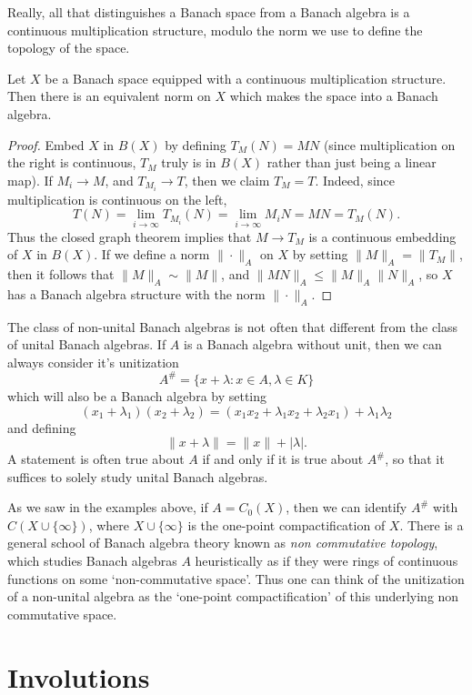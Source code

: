 Really, all that distinguishes a Banach space from a Banach algebra is a continuous multiplication structure, modulo the norm we use to define the topology of the space.

\begin{prop}
    Let $X$ be a Banach space equipped with a continuous multiplication structure. Then there is an equivalent norm on $X$ which makes the space into a Banach algebra.
\end{prop}
\begin{proof}
    Embed $X$ in $B(X)$ by defining $T_M(N) = MN$ (since multiplication on the right is continuous, $T_M$ truly is in $B(X)$ rather than just being a linear map). If $M_i \to M$, and $T_{M_i} \to T$, then we claim $T_M = T$. Indeed, since multiplication is continuous on the left,
    \[ T(N) = \lim_{i \to \infty} T_{M_i}(N) = \lim_{i \to \infty} M_i N = MN = T_M(N). \]
    Thus the closed graph theorem implies that $M \to T_M$ is a continuous embedding of $X$ in $B(X)$. If we define a norm $\| \cdot \|_A$ on $X$ by setting $\| M \|_A = \| T_M \|$, then it follows that $\| M \|_A \sim \| M \|$, and $\| MN \|_A \leq \| M \|_A \| N \|_A$, so $X$ has a Banach algebra structure with the norm $\| \cdot \|_A$.
\end{proof}

The class of non-unital Banach algebras is not often that different from the class of unital Banach algebras. If $A$ is a Banach algebra without unit, then we can always consider it's unitization
%
\[ A^\# = \{ x + \lambda : x \in A, \lambda \in K \} \]
%
which will also be a Banach algebra by setting
%
\[ (x_1 + \lambda_1)(x_2 + \lambda_2) = (x_1x_2 + \lambda_1 x_2 + \lambda_2 x_1) + \lambda_1 \lambda_2 \]
%
and defining
%
\[ \| x + \lambda \| = \| x \| + |\lambda|. \]
%
A statement is often true about $A$ if and only if it is true about $A^\#$, so that it suffices to solely study unital Banach algebras.

As we saw in the examples above, if $A = C_0(X)$, then we can identify $A^\#$ with $C(X \cup \{ \infty \})$, where $X \cup \{ \infty \}$ is the one-point compactification of $X$. There is a general school of Banach algebra theory known as \emph{non commutative topology}, which studies Banach algebras $A$ heuristically as if they were rings of continuous functions on some `non-commutative space'. Thus one can think of the unitization of a non-unital algebra as the `one-point compactification' of this underlying non commutative space.

\section{Involutions}

